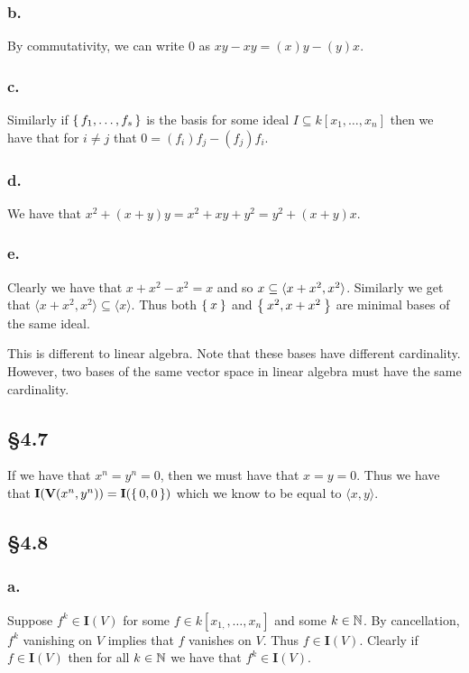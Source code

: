 \documentclass[letterpaper]{article}
\begin{document}
\subsubsection{b.}

By commutativity, we can write $0$ as $xy - xy = (x)y - (y)x$.

\subsubsection{c.}

Similarly if $\set{f_{1}, \ldots, f_{s}}$ is the basis for some ideal $I \subseteq k[x_{1}, \ldots, x_{n}]$ then we have that for $i \neq j$ that $0 = (f_{i}) f_{j} - (f_{j}) f_{i}$.

\subsubsection{d.}

We have that $x^{2} + (x + y)y = x^{2} + xy + y^{2} = y^{2} + (x + y)x$.

\subsubsection{e.}

Clearly we have that $x + x^{2} - x^{2} = x$ and so $\gen{x} \subseteq \langle x + x^{2}, x^{2} \rangle$. Similarly we get that $\langle x + x^{2}, x^{2} \rangle \subseteq \langle x \rangle$. Thus both $\Set{x}$ and $\Set{x^{2}, x + x^{2}}$ are minimal bases of the same ideal.

This is different to linear algebra. Note that these bases have different cardinality. However, two bases of the same vector space in linear algebra must have the same cardinality.

\subsection{\S 4.7}

If we have that $x^{n} = y^{n} = 0$, then we must have that $x = y = 0$. Thus we have that $\textbf{I}\pqty{\textbf{V}\pqty{x^{n}, y^{n}}} = \textbf{I}(\set{0, 0})$ which we know to be equal to $\langle x, y \rangle$.

\subsection{\S 4.8}

\subsubsection{a.}
Suppose $f^{k} \in \textbf{I}(V)$ for some $f \in k[x_{1,}, \ldots, x_{n}]$ and some $k \in \mathbb{N}$. By cancellation, $f^{k}$ vanishing on $V$ implies that $f$ vanishes on $V$. Thus $f \in \textbf{I}(V)$. Clearly if $f \in \textbf{I}(V)$ then for all $k \in \mathbb{N}$ we have that $f^{k} \in \textbf{I}(V)$.
\end{document}

